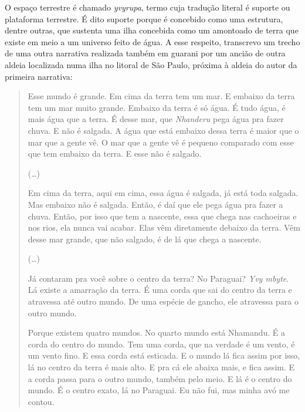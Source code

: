 O espaço terrestre é chamado \emph{yvyrupa}, termo cuja tradução literal é
suporte ou plataforma terrestre. É dito suporte porque é concebido como
uma estrutura, dentre outras, que sustenta uma ilha concebida como um
amontoado de terra que existe em meio a um universo feito de água. A
esse respeito, transcrevo um trecho de uma outra narrativa realizada
também em guarani por um ancião de outra aldeia localizada numa ilha no
litoral de São Paulo, próxima à aldeia do autor da primeira narrativa:

\begin{quotation}
\noindent
Esse mundo é grande. Em cima da terra tem um mar. E embaixo da terra tem
um mar muito grande. Embaixo da terra é só água. É tudo água, é mais
água que a terra. É desse mar, que \emph{Nhanderu} pega água pra fazer chuva.
E não é salgada. A água que está embaixo dessa terra é maior que o mar
que a gente vê. O mar que a gente vê é pequeno comparado com esse que
tem embaixo da terra. E esse não é salgado.

\medskip

\noindent
(\ldots{})

\medskip

\noindent
Em cima da terra, aqui em cima, essa água é salgada, já está toda
salgada. Mas embaixo não é salgada. Então, é daí que ele pega água pra
fazer a chuva. Então, por isso que tem a nascente, essa que chega nas
cachoeiras e nos rios, ela nunca vai acabar. Elas vêm diretamente
debaixo da terra. Vêm desse mar grande, que não salgado, é de lá que
chega a nascente.

\medskip

\noindent
(\ldots{}) 

\medskip

\noindent
Já contaram pra você sobre o centro da terra? No Paraguai? \emph{Yvy mbyte}. Lá
existe a amarração da terra. É uma corda que sai do centro da terra e
atravessa até outro mundo. De uma espécie de gancho, ele atravessa para
o outro mundo.

\noindent
Porque existem quatro mundos. No quarto mundo está Nhamandu. É a corda
do centro do mundo. Tem uma corda, que na verdade é um vento, é um
vento fino. E essa corda está esticada. E o mundo lá fica assim por
isso, lá no centro da terra é mais alto. E pra cá ele abaixa mais, e
fica assim. E a corda passa para o outro mundo, também pelo meio. E lá
é o centro do mundo. É o centro exato, lá no Paraguai. Eu não fui, mas
minha avó me contou.
\end{quotation}

